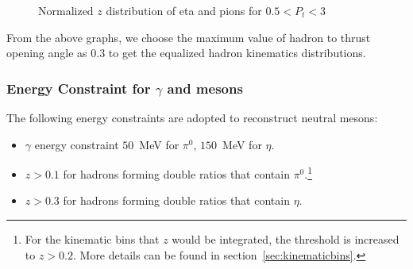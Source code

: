 \begin{figure}[H]
\captionsetup[subfloat]{farskip=2pt,captionskip=1pt}
\centering
{}
\caption{Normalized $z$ distribution of eta and pions for $0.5<P_t<3$}
\label{fig:kine_distri8}
\end{figure}

From the above graphs, we choose the maximum value of hadron to thrust opening angle as $0.3$ to get the equalized hadron kinematics distributions. 

\subsubsection{\texorpdfstring{Energy Constraint for $\gamma$ and mesons}{Energy Constraint for gamma and mesons}}
\label{sec:energyconstraint}
The following energy constraints are adopted to reconstruct neutral mesons:
\begin{itemize}
\item $\gamma$ energy constraint $50$~MeV for $\pi^0$, $150$~MeV for $\eta$.
\item $z>0.1$ for hadrons forming double ratios that contain $\pi^0$.\footnote{For the kinematic bins that $z$ would be integrated, the threshold is increased to $z>0.2$. More details can be found in section~\ref{sec:kinematicbins}.}
\item $z>0.3$ for hadrons forming double ratios that contain $\eta$. 
\end{itemize}

